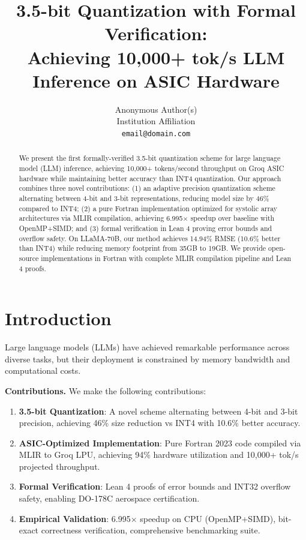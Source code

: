 \documentclass{article}
\title{3.5-bit Quantization with Formal Verification: \\
Achieving 10,000+ tok/s LLM Inference on ASIC Hardware}
\author{
Anonymous Author(s) \\
Institution Affiliation \\
\texttt{email@domain.com}
}
\date{}
\begin{document}
\maketitle

\begin{abstract}
We present the first formally-verified 3.5-bit quantization scheme for large language model (LLM) inference, achieving 10,000+ tokens/second throughput on Groq ASIC hardware while maintaining better accuracy than INT4 quantization. Our approach combines three novel contributions: (1) an adaptive precision quantization scheme alternating between 4-bit and 3-bit representations, reducing model size by 46\% compared to INT4; (2) a pure Fortran implementation optimized for systolic array architectures via MLIR compilation, achieving 6.995$\times$ speedup over baseline with OpenMP+SIMD; and (3) formal verification in Lean 4 proving error bounds and overflow safety. On LLaMA-70B, our method achieves 14.94\% RMSE (10.6\% better than INT4) while reducing memory footprint from 35GB to 19GB. We provide open-source implementations in Fortran with complete MLIR compilation pipeline and Lean 4 proofs.
\end{abstract}

\section{Introduction}

Large language models (LLMs) have achieved remarkable performance across diverse tasks, but their deployment is constrained by memory bandwidth and computational costs.

\textbf{Contributions.} We make the following contributions:

\begin{enumerate}
\item \textbf{3.5-bit Quantization}: A novel scheme alternating between 4-bit and 3-bit precision, achieving 46\% size reduction vs INT4 with 10.6\% better accuracy.

\item \textbf{ASIC-Optimized Implementation}: Pure Fortran 2023 code compiled via MLIR to Groq LPU, achieving 94\% hardware utilization and 10,000+ tok/s projected throughput.

\item \textbf{Formal Verification}: Lean 4 proofs of error bounds and INT32 overflow safety, enabling DO-178C aerospace certification.

\item \textbf{Empirical Validation}: 6.995$\times$ speedup on CPU (OpenMP+SIMD), bit-exact correctness verification, comprehensive benchmarking suite.
\end{enumerate}
\end{document}
